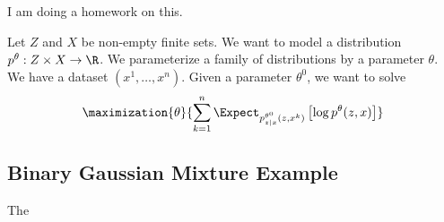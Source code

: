 
\sbasic






































\sstart
{}


I am doing a homework on this.


Let $Z$ and $X$ be non-empty finite sets.
We want to model a distribution
$p^\theta: Z \times X \to \R$.
We parameterize a family
of distributions by a parameter $\theta$.
We have a dataset $(x^1, \dots, x^n)$.
Given a parameter $\theta^0$, we want
to solve
\[
  \maximization{\theta}{\sum_{k = 1}^{n}
    \Expect_{p^{\theta^0}_{z \mid x}(z, x^k)}
    \left[
      \log p^{\theta}(z, x)
    \right]
  }
\]
\subsection{Binary Gaussian Mixture Example}
The

